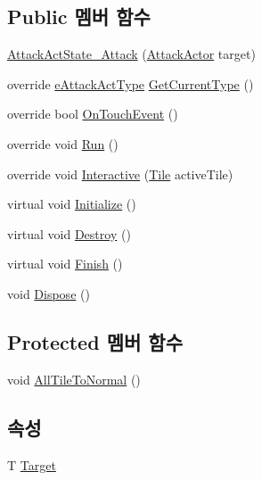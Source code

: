 \subsection*{Public 멤버 함수}
\begin{DoxyCompactItemize}
\item 
\hyperlink{class_attack_actor_1_1_attack_act_state___attack_a2503cf96e99f943f0be13c3a87e7dd12}{Attack\+Act\+State\+\_\+\+Attack} (\hyperlink{class_attack_actor}{Attack\+Actor} target)
\item 
override \hyperlink{_attack_actor_8cs_a10659ce944335df4ded984f6bc41f31b}{e\+Attack\+Act\+Type} \hyperlink{class_attack_actor_1_1_attack_act_state___attack_a6622c1356f5d7384b9914bb9611ad285}{Get\+Current\+Type} ()
\item 
override bool \hyperlink{class_attack_actor_1_1_attack_act_state___attack_aedb0e05d966cc6b98f92a72f9e5e673a}{On\+Touch\+Event} ()
\item 
override void \hyperlink{class_attack_actor_1_1_attack_act_state___attack_a2755f4dae2cf1f80a94b6bcc973d1bfd}{Run} ()
\item 
override void \hyperlink{class_attack_actor_1_1_attack_act_state___attack_a59a3f2e994baeddabb870446b5df1641}{Interactive} (\hyperlink{class_tile}{Tile} active\+Tile)
\item 
virtual void \hyperlink{class_f_z_1_1_state_a27ac6fd2e844476017b35aa781d73c8c}{Initialize} ()
\item 
virtual void \hyperlink{class_f_z_1_1_state_aa85fdf4a5495d6d5d3ed4aeda3497c8a}{Destroy} ()
\item 
virtual void \hyperlink{class_f_z_1_1_state_a288bb8c3fceee4bf03f01e295dcef1be}{Finish} ()
\item 
void \hyperlink{class_f_z_1_1_state_a598887d3fbb412fada132dc1c079b25b}{Dispose} ()
\end{DoxyCompactItemize}
\subsection*{Protected 멤버 함수}
\begin{DoxyCompactItemize}
\item 
void \hyperlink{class_attack_actor_1_1_attack_act_state_a993762ec959af926e416f03fa7b71203}{All\+Tile\+To\+Normal} ()
\end{DoxyCompactItemize}
\subsection*{속성}
\begin{DoxyCompactItemize}
\item 
T \hyperlink{class_f_z_1_1_state_a6927f5c9f2517052f9dc5596188e9d95}{Target}
\end{DoxyCompactItemize}


